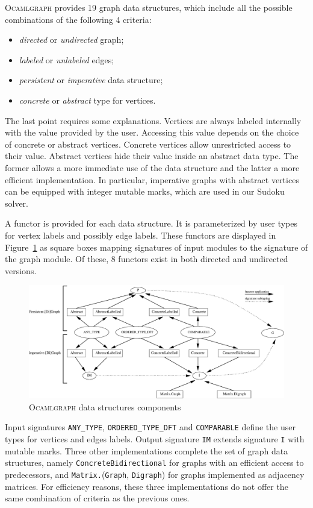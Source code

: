 \documentclass[tfpsymp,pagenumbers]{tfp07symp}
\newcommand{\ocamlgraph}{\textsc{Ocamlgraph}\xspace}
\begin{document}
\ocamlgraph provides 19 graph data structures, which include all the
possible combinations of the following 4 criteria:
\begin{itemize}
\item \emph{directed} or \emph{undirected} graph;
\item \emph{labeled} or \emph{unlabeled} edges;
\item \emph{persistent} or \emph{imperative} data structure;
\item \emph{concrete} or \emph{abstract} type for vertices.
\end{itemize}
The last point requires some explanations. Vertices are always labeled
internally with the value provided by the user. Accessing this value
depends on the choice of concrete or abstract vertices.  Concrete
vertices allow unrestricted access to their value.  Abstract vertices
hide their value inside an abstract data type.  The former allows a
more immediate use of the data structure and the latter a more
efficient implementation. In particular, imperative graphs with
abstract vertices can be equipped with integer mutable marks, which
are used in our Sudoku solver.

A functor is provided for each data structure. It is parameterized by
user types for vertex labels and possibly edge labels. These functors
are displayed in Figure~\ref{fig:interfaces} as square boxes mapping
signatures of input modules to the signature of the graph module.
Of these, 8 functors exist in both directed and undirected versions.
\begin{figure}
  \centering
  \includegraphics[width=\textwidth]{interface.eps} 
  \caption{\ocamlgraph data structures components}\label{fig:interfaces}
\end{figure}
Input signatures \texttt{ANY\_TYPE}, \texttt{ORDERED\_TYPE\_DFT} and
\texttt{COMPARABLE} define the user types for vertices and edges
labels. Output signature \texttt{IM} extends signature \texttt{I} with
mutable marks. Three other implementations complete the set of graph
data structures, namely \texttt{ConcreteBidirectional} for graphs with
an efficient access to predecessors, and
\texttt{Matrix.}(\texttt{Graph}, \texttt{Digraph}) for graphs
implemented as adjacency matrices. For efficiency reasons, these three
implementations do not offer the same combination of criteria as the
previous ones.
\end{document}

